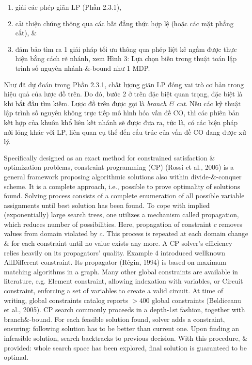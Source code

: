 \documentclass{article}
\begin{document}
\begin{itemize}
\begin{itemize}
\begin{itemize}
\begin{itemize}
                \begin{enumerate}
                    \item giải các phép giãn LP (Phần 2.3.1),
                    \item cải thiện chúng thông qua các bất đẳng thức hợp lệ (hoặc các mặt phẳng cắt), \&
                    \item đảm bảo tìm ra 1 giải pháp tối ưu thông qua phép liệt kê ngầm được thực hiện bằng cách rẽ nhánh, xem {\sf Hình 3: Lựa chọn biến trong thuật toán lập trình số nguyên nhánh-\&-bound như 1 MDP.}
                \end{enumerate}
                Như đã dự đoán trong Phần 2.3.1, chất lượng giãn LP đóng vai trò cơ bản trong hiệu quả của lược đồ trên. Do đó, bước 2 ở trên đặc biệt quan trọng, đặc biệt là khi bắt đầu tìm kiếm. Lược đồ trên được gọi là {\it branch \& cut}. Nếu các kỹ thuật lập trình số nguyên không trực tiếp mô hình hóa vấn đề CO, thì các phiên bản kết hợp của khuôn khổ liên kết nhánh sẽ được đưa ra, tức là, có các biện pháp nới lỏng khác với LP, liên quan cụ thể đến cấu trúc của vấn đề CO đang được xử lý.

                Specifically designed as an exact method for constrained satisfaction \& optimization problems, constraint programming (CP) (Rossi et al., 2006) is a general framework proposing algorithmic solutions also within divide-\&-conquer scheme. It is a complete approach, i.e., possible to prove optimality of solutions found. Solving process consists of a complete enumeration of all possible variable assignments until best solution has been found. To cope with implied (exponentially) large search trees, one utilizes a mechanism called propagation, which reduces number of possibilities. Here, propagation of constraint $c$ removes values from domain violated by $c$. This process is repeated at each domain change \& for each constraint until no value exists any more. A CP solver's efficiency relies heavily on its propagators' quality. Example 4 introduced wellknown AllDifferent constraint. Its propagator (Régin, 1994) is based on maximum matching algorithms in a graph. Many other global constraints are available in literature, e.g. Element constraint, allowing indexation with variables, or Circuit constraint, enforcing a set of variables to create a valid circuit. At time of writing, global constraints catalog reports $> 400$ global constraints (Beldiceanu et al., 2005). CP search commonly proceeds in a depth-1st fashion, together with branch\&-bound. For each feasible solution found, solver adds a constraint, ensuring: following solution has to be better than current one. Upon finding an infeasible solution, search backtracks to previous decision. With this procedure, \& provided: whole search space has been explored, final solution is guaranteed to be optimal.


\end{itemize}
\end{itemize}
\end{itemize}
\end{itemize}
\end{document}
